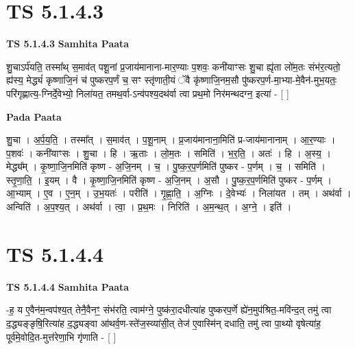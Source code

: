\documentclass[17pt]{extarticle}
\begin{document}

\section{ TS 5.1.4.3 }

\textbf{TS 5.1.4.3 } \newline
\textbf{Samhita Paata} \newline

शु॒चाऽर्प॑यति॒ तस्मा᳚थ् स॒माव॑त् पशू॒नां प्र॒जाय॑मानाना-मार॒ण्याः प॒शवः॒ कनी॑याꣳसः शु॒चा ह्यृ॑ता लो॑म॒तः संभ॑र॒त्यतो॒ ह्य॑स्य॒ मेद्ध्यं॑ कृष्णाजि॒नं च॑ पुष्करप॒र्णं च॒ सꣳ स्तृ॑णाती॒यं ॅवै कृ॑ष्णाजि॒नम॒सौ पु॑ष्करप॒र्ण-मा॒भ्या-मे॒वैन॑-मुभ॒यतः॒ परि॑गृह्णात्य॒-ग्निर्दे॒वेभ्यो॒ निला॑यत॒ तमथ॒र्वा-ऽन्व॑पश्य॒दथ॑र्वा त्वा प्रथ॒मो निर॑मन्थदग्न॒ इत्या॑ - [  ] \newline

\textbf{Pada Paata} \newline

शु॒चा । अ॒र्प॒य॒ति॒ । तस्मा᳚त् । स॒माव॑त् । प॒शू॒नाम् । प्र॒जाय॑मानाना॒मिति॑ प्र-जाय॑मानानाम् । आ॒र॒ण्याः । प॒शवः॑ । कनी॑याꣳसः । शु॒चा । हि । ऋ॒ताः । लो॒म॒तः । समिति॑ । भ॒र॒ति॒ । अतः॑ । हि । अ॒स्य॒ । मेद्ध्य᳚म् । कृ॒ष्णा॒जि॒नमिति॑ कृष्ण - अ॒जि॒नम् । च॒ । पु॒ष्क॒र॒प॒र्णमिति॑ पुष्कर - प॒र्णम् । च॒ । समिति॑ । स्तृ॒णा॒ति॒ । इ॒यम् । वै । कृ॒ष्णा॒जि॒नमिति॑ कृष्ण - अ॒जि॒नम् । अ॒सौ । पु॒ष्क॒र॒प॒र्णमिति॑ पुष्कर - प॒र्णम् । आ॒भ्याम् । ए॒व । ए॒न॒म् । उ॒भ॒यतः॑ । परीति॑ । गृ॒ह्णा॒ति॒ । अ॒ग्निः । दे॒वेभ्यः॑ । निला॑यत । तम् । अथ॑र्वा । अन्विति॑ । अ॒प॒श्य॒त् । अथ॑र्वा । त्वा॒ । प्र॒थ॒मः । निरिति॑ । अ॒म॒न्थ॒त् । अ॒ग्ने॒ । इति॑ ।  \newline





\section{ TS 5.1.4.4 }

\textbf{TS 5.1.4.4 } \newline
\textbf{Samhita Paata} \newline

-ह॒ य ए॒वैन॑म॒न्वप॑श्य॒त् तेनै॒वैनꣳ॒॒ संभ॑रति॒ त्वाम॑ग्ने॒ पुष्क॑रा॒दधीत्या॑ह पुष्करप॒र्णे ह्ये॑न॒मुप॑श्रित॒-मवि॑न्द॒त् तमु॑ त्वा द॒द्ध्यङ्ङृषि॒रित्या॑ह द॒द्ध्यङ्वा आ॑थर्व॒ण-स्ते॑ज॒स्व्या॑सी॒त् तेज॑ ए॒वास्मि॑न् दधाति॒ तमु॑ त्वा पा॒थ्यो वृषेत्या॑ह॒ पूर्व॑मे॒वोदि॒त-मुत्त॑रेणा॒भि गृ॑णाति - [  ] \newline
\end{document}
